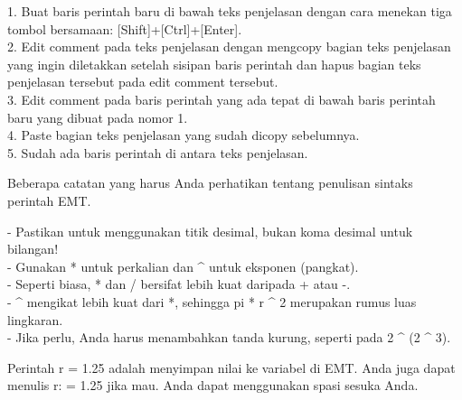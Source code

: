\begin{eulernotebook}
\begin{eulercomment}
    1. Buat baris perintah baru di bawah teks penjelasan dengan cara
    menekan tiga tombol bersamaan: [Shift]+[Ctrl]+[Enter].\\
    2. Edit comment pada teks penjelasan dengan mengcopy bagian teks
    penjelasan yang ingin diletakkan setelah sisipan baris perintah dan
    hapus bagian teks penjelasan tersebut pada edit comment tersebut.\\
    3. Edit comment pada baris perintah yang ada tepat di bawah baris
    perintah baru yang dibuat pada nomor 1.\\
    4. Paste bagian teks penjelasan yang sudah dicopy sebelumnya.\\
    5. Sudah ada baris perintah di antara teks penjelasan.

    \end{eulercomment}
    \eulersubheading{}
    \begin{eulercomment}
    Beberapa catatan yang harus Anda perhatikan tentang penulisan sintaks
    perintah EMT.
    
    - Pastikan untuk menggunakan titik desimal, bukan koma desimal untuk
    bilangan!\\
    - Gunakan * untuk perkalian dan \textasciicircum{} untuk eksponen (pangkat).\\
    - Seperti biasa, * dan / bersifat lebih kuat daripada + atau -.\\
    - \textasciicircum{} mengikat lebih kuat dari *, sehingga pi * r \textasciicircum{} 2 merupakan rumus
    luas lingkaran.\\
    - Jika perlu, Anda harus menambahkan tanda kurung, seperti pada 2 \textasciicircum{} (2
    \textasciicircum{} 3).
    
    Perintah r = 1.25 adalah menyimpan nilai ke variabel di EMT. Anda juga
    dapat menulis r: = 1.25 jika mau. Anda dapat menggunakan spasi sesuka
    Anda.
    

\end{eulercomment}
\end{eulernotebook}
